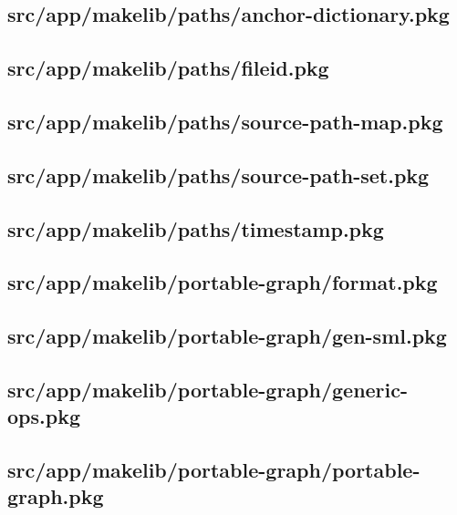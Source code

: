 \subsection{src/app/makelib/paths/anchor-dictionary.pkg}


\subsection{src/app/makelib/paths/fileid.pkg}


\subsection{src/app/makelib/paths/source-path-map.pkg}


\subsection{src/app/makelib/paths/source-path-set.pkg}


\subsection{src/app/makelib/paths/timestamp.pkg}


\subsection{src/app/makelib/portable-graph/format.pkg}


\subsection{src/app/makelib/portable-graph/gen-sml.pkg}


\subsection{src/app/makelib/portable-graph/generic-ops.pkg}


\subsection{src/app/makelib/portable-graph/portable-graph.pkg}


